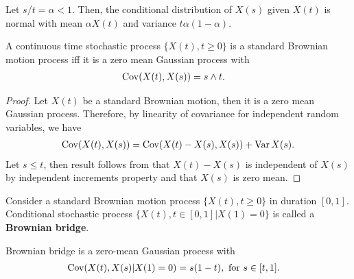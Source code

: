 \documentclass[a4paper,10pt,english]{article}
\begin{document}
\begin{cor} Let $s/t = \alpha < 1$. Then, the conditional distribution of $X(s)$ given $X(t)$ is normal with mean $\alpha X(t)$ and variance $t \alpha(1-\alpha)$.
\end{cor}
\begin{thm} A continuous time stochastic process $\{X(t), t \geqslant 0\}$ is a standard Brownian motion process iff it is a zero mean Gaussian process with 
\begin{align*}
\operatorname{Cov}(X(t), X(s)) &= s \wedge t.
\end{align*}
\end{thm}
\begin{proof} Let $X(t)$ be a standard Brownian motion, then it is a zero mean Gaussian process. 
Therefore, by linearity of covariance for independent random variables, we have
\begin{align*}
\operatorname{Cov}(X(t),X(s))  = \operatorname{Cov}(X(t)-X(s),X(s)) + \operatorname{Var} X(s).
\end{align*}
Let $s \leq t$, then result follows from that $X(t) - X(s)$ is independent of $X(s)$ by independent increments property and that $X(s)$ is zero mean. 
\end{proof}
\begin{defn} Consider a standard Brownian motion process $\{X(t), t \geqslant 0\}$ in duration $[0,1]$. Conditional stochastic process $\{X(t), t \in [0,1]| X(1) = 0\}$ is called a \textbf{Brownian bridge}.
\end{defn}
\begin{prop} Brownian bridge is a zero-mean Gaussian process with 
\begin{align*}
\operatorname{Cov}(X(t), X(s)|X(1) = 0) &= s(1- t),\text{ for } s \in [t, 1].
\end{align*}
\end{prop}
\end{document}
